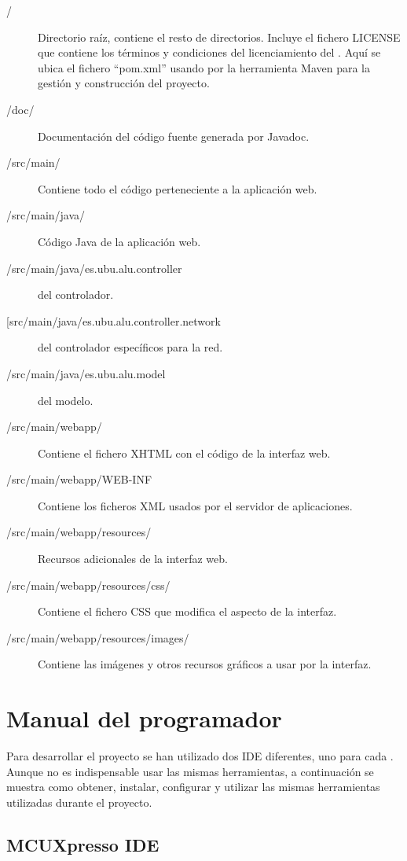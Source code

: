 \begin{description}
  \item[/] Directorio raíz, contiene el resto de directorios. Incluye el
  fichero LICENSE que contiene los términos y condiciones del licenciamiento
  del \sw{}. Aquí se ubica el
  fichero ``pom.xml'' usando por la herramienta Maven para la gestión y
  construcción del proyecto.
  \item[/doc/] Documentación del código fuente generada por Javadoc.
  \item[/src/main/] Contiene todo el código perteneciente a la aplicación web.
  \item[/src/main/java/] Código Java de la aplicación web.
  \item[/src/main/java/es.ubu.alu.controller]  del
  controlador.
  \item[[src/main/java/es.ubu.alu.controller.network]  del
  controlador específicos para la red.
  \item[/src/main/java/es.ubu.alu.model]  del modelo.
  \item[/src/main/webapp/] Contiene el fichero XHTML con el código de la
  interfaz web.
  \item[/src/main/webapp/WEB-INF] Contiene los ficheros XML usados por
  el servidor de aplicaciones.
  \item[/src/main/webapp/resources/] Recursos adicionales de la interfaz web.
  \item[/src/main/webapp/resources/css/] Contiene el fichero CSS que modifica el
  aspecto de la interfaz.
  \item[/src/main/webapp/resources/images/] Contiene las imágenes y otros
  recursos gráficos a usar por la interfaz.
\end{description}



\section{Manual del programador}
Para desarrollar el proyecto se han utilizado dos IDE diferentes, uno para cada
\sw{}. Aunque no es indispensable usar las mismas herramientas, a continuación
se muestra como obtener, instalar, configurar y utilizar las mismas herramientas
utilizadas durante el proyecto.


\subsection{MCUXpresso IDE} \label{sec:man-dev-mcuxpresso}

